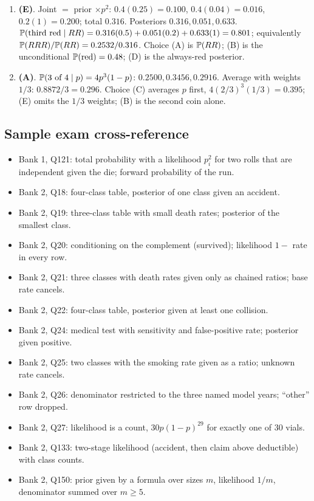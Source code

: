 \begin{enumerate}[nosep,leftmargin=2em]
  \item \textbf{(E)}. Joint $= $ prior $\times p^2$: $0.4(0.25) = 0.100$, $0.4(0.04) = 0.016$,
        $0.2(1) = 0.200$; total $0.316$. Posteriors $0.316, 0.051, 0.633$.
        $\mathbb{P}(\text{third red} \mid RR) = 0.316(0.5) + 0.051(0.2) + 0.633(1) = 0.801$;
        equivalently $\mathbb{P}(RRR)/\mathbb{P}(RR) = 0.2532/0.316$. Choice (A) is $\mathbb{P}(RR)$; (B) is
        the unconditional $\mathbb{P}(\text{red}) = 0.48$; (D) is the always-red posterior.
  \item \textbf{(A)}. $\mathbb{P}(\text{3 of 4} \mid p) = 4p^3(1-p)$: $0.2500, 0.3456, 0.2916$.
        Average with weights $1/3$: $0.8872/3 = 0.296$. Choice (C) averages $p$ first,
        $4(2/3)^3(1/3) = 0.395$; (E) omits the $1/3$ weights; (B) is the second coin alone.
\end{enumerate}

\subsection{Sample exam cross-reference}

\begin{itemize}[nosep,leftmargin=2em]
  \item Bank 1, Q121: total probability with a likelihood $p_i^2$ for two rolls that are
        independent given the die; forward probability of the run.
  \item Bank 2, Q18: four-class table, posterior of one class given an accident.
  \item Bank 2, Q19: three-class table with small death rates; posterior of the smallest class.
  \item Bank 2, Q20: conditioning on the complement (survived); likelihood $1 - $ rate in every row.
  \item Bank 2, Q21: three classes with death rates given only as chained ratios; base rate cancels.
  \item Bank 2, Q22: four-class table, posterior given at least one collision.
  \item Bank 2, Q24: medical test with sensitivity and false-positive rate; posterior given positive.
  \item Bank 2, Q25: two classes with the smoking rate given as a ratio; unknown rate cancels.
  \item Bank 2, Q26: denominator restricted to the three named model years; ``other'' row dropped.
  \item Bank 2, Q27: likelihood is a count, $30p(1-p)^{29}$ for exactly one of 30 vials.
  \item Bank 2, Q133: two-stage likelihood (accident, then claim above deductible) with class counts.
  \item Bank 2, Q150: prior given by a formula over sizes $m$, likelihood $1/m$, denominator summed over $m \geq 5$.
\end{itemize}

